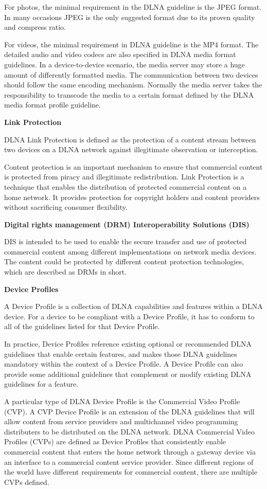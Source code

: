 For photos, the minimal requirement in the DLNA guideline is the JPEG format. In
many occasions JPEG is the only suggested format due to its proven quality and
compress ratio.

For videos, the minimal requirement in DLNA guideline is the MP4 format. The
detailed audio and video codecs are also specified in DLNA media format
guidelines. In a device-to-device scenario, the media server may store a huge
amount of differently formatted media. The communication between two devices
should follow the same encoding mechanism. Normally the media server takes the
responsibility to transcode the media to a certain format defined by the DLNA
media format profile guideline.

\textbf{Link Protection}

DLNA Link Protection is defined as the protection of a content stream between two 
devices on a DLNA network against illegitimate observation or interception.

Content protection is an important mechanism to ensure that commercial content is protected 
from piracy and illegitimate redistribution. Link Protection is a technique that enables the
distribution of protected commercial content on a home network. It provides
protection for copyright holders and content providers without sacrificing
consumer flexibility.

\textbf{Digital rights management (DRM) Interoperability Solutions (DIS) }

DIS is intended to be used to enable the secure transfer and use of protected 
commercial content among different implementations on network media devices. 
The content could be protected by different content protection technologies, 
which are described as DRMs in short.

\textbf{Device Profiles}

A Device Profile is a collection of DLNA capabilities and features within a DLNA device. For a device 
to be compliant with a Device Profile, it has to conform to all of the guidelines listed for that 
Device Profile.

In practice, Device Profiles reference existing optional or recommended DLNA guidelines that enable certain features, and makes those DLNA guidelines mandatory within the context of a Device Profile. 
A Device Profile can also provide some additional guidelines that complement or
modify existing DLNA guidelines for a feature.

A particular type of DLNA Device Profile is the Commercial Video Profile (CVP).
A CVP Device Profile is an extension of the DLNA guidelines that will allow
content from service providers and multichannel video programming distributers to be distributed on the DLNA network. DLNA Commercial Video Profiles (CVPs) are defined as Device Profiles that consistently enable commercial content that enters the home network through a gateway device via an interface to a commercial content service provider. Since different regions of the world have different requirements for commercial content, there are multiple CVPs defined.


